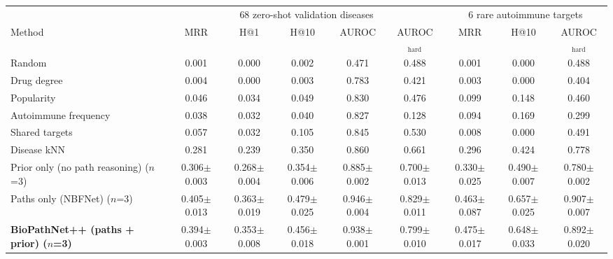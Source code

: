 \begin{tabular}{lcccccccc}
\toprule
 & \multicolumn{5}{c}{68 zero-shot validation diseases} & \multicolumn{3}{c}{6 rare autoimmune targets}\\
\cmidrule(lr){2-6}\cmidrule(lr){7-9}
Method & MRR & H@1 & H@10 & AUROC & AUROC$_{\text{hard}}$ & MRR & H@10 & AUROC$_{\text{hard}}$\\
\midrule
Random & 0.001 & 0.000 & 0.002 & 0.471 & 0.488 & 0.001 & 0.000 & 0.488\\
Drug degree & 0.004 & 0.000 & 0.003 & 0.783 & 0.421 & 0.003 & 0.000 & 0.404\\
Popularity & 0.046 & 0.034 & 0.049 & 0.830 & 0.476 & 0.099 & 0.148 & 0.460\\
Autoimmune frequency & 0.038 & 0.032 & 0.040 & 0.827 & 0.128 & 0.094 & 0.169 & 0.299\\
Shared targets & 0.057 & 0.032 & 0.105 & 0.845 & 0.530 & 0.008 & 0.000 & 0.491\\
Disease kNN & 0.281 & 0.239 & 0.350 & 0.860 & 0.661 & 0.296 & 0.424 & 0.778\\
\midrule
Prior only (no path reasoning) ($n$=3) & 0.306$\pm$0.003 & 0.268$\pm$0.004 & 0.354$\pm$0.006 & 0.885$\pm$0.002 & 0.700$\pm$0.013 & 0.330$\pm$0.025 & 0.490$\pm$0.007 & 0.780$\pm$0.002\\
Paths only (NBFNet) ($n$=3) & 0.405$\pm$0.013 & 0.363$\pm$0.019 & 0.479$\pm$0.025 & 0.946$\pm$0.004 & 0.829$\pm$0.011 & 0.463$\pm$0.087 & 0.657$\pm$0.025 & 0.907$\pm$0.007\\
\textbf{BioPathNet++ (paths + prior) ($n$=3)} & 0.394$\pm$0.003 & 0.353$\pm$0.008 & 0.456$\pm$0.018 & 0.938$\pm$0.001 & 0.799$\pm$0.010 & 0.475$\pm$0.017 & 0.648$\pm$0.033 & 0.892$\pm$0.020\\
\bottomrule
\end{tabular}